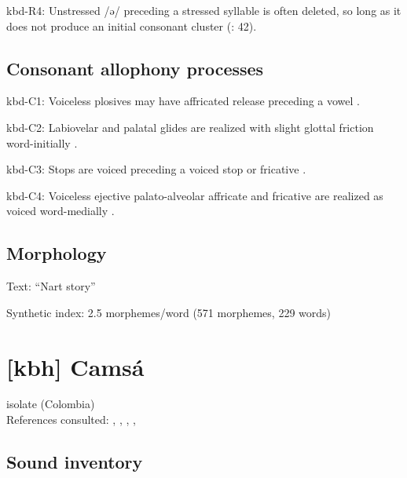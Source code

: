 {\begin{appendixdesc}
\item[kbd-R4:] Unstressed /ə/ preceding a stressed syllable is often deleted, so long as it does not produce an initial consonant cluster (\citealt{GordonApplebaum2010}: 42).
\end{appendixdesc}
\subsection*{Consonant allophony processes}
\begin{appendixdesc}

\item[kbd-C1:] Voiceless plosives may have affricated release preceding a vowel \citep[17]{Kuipers1960}.

\item[kbd-C2:] Labiovelar and palatal glides are realized with slight glottal friction word-initially \citep[22]{Kuipers1960}.

\item[kbd-C3:] Stops are voiced preceding a voiced stop or fricative \citep[11]{Matasović2010}.

\item[kbd-C4:] Voiceless ejective palato-alveolar affricate and fricative are realized as voiced word-medially \citep[19]{Kuipers1960}.
\end{appendixdesc}
\subsection*{Morphology}

\begin{appendixdesc}

\item[Text:] “Nart story” \citep[223--231]{Applebaum2013}

\item[Synthetic index:] 2.5 morphemes/word (571 morphemes, 229 words)
\end{appendixdesc}
\section*{[kbh] Camsá}  %
isolate (Colombia)\medskip\\
References consulted: \citet{Fabre2002}, \citet{Howard1967}, \citet{Howard1972},  \citet{JuajibioyChindoy1962},  \citet{MonguiSánchez1981}

\subsection*{Sound inventory}
\begin{appendixdesc}


\end{appendixdesc}}
